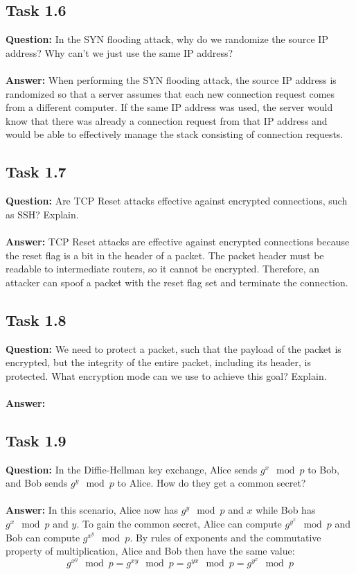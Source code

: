 \documentclass[11pt]{article}
\begin{document}
\subsection*{Task 1.6}

\textbf{Question: } In the SYN flooding attack, why do we randomize the source IP address? Why can’t we just use the same IP address? \\\\
\textbf{Answer: } When performing the SYN flooding attack, the source IP address is randomized so that a server assumes that each new connection request comes from a different computer. If the same IP address was used, the server would know that there was already a connection request from that IP address and would be able to effectively manage the stack consisting of connection requests.

\subsection*{Task 1.7}

\textbf{Question: } Are TCP Reset attacks effective against encrypted connections, such as SSH? Explain. \\\\
\textbf{Answer: } TCP Reset attacks are effective against encrypted connections because the reset flag is a bit in the header of a packet. The packet header must be readable to intermediate routers, so it cannot be encrypted. Therefore, an attacker can spoof a packet with the reset flag set and terminate the connection.

\subsection*{Task 1.8}

\textbf{Question: } We need to protect a packet, such that the payload of the packet is encrypted, but the integrity of the entire packet, including its header, is protected. What encryption mode can we use to achieve this goal? Explain. \\\\
\textbf{Answer: }

\subsection*{Task 1.9}

\textbf{Question: } 
In the Diffie-Hellman key exchange, Alice sends $g^x \mod p$ to Bob, and Bob sends $g^y \mod p$ to Alice. How do they get a common secret? \\\\
\textbf{Answer: } In this scenario, Alice now has $g^y \mod p$ and $x$ while Bob has $g^x \mod p$ and $y$. To gain the common secret, Alice can compute $g^{y^x} \mod p$ and Bob can compute $g^{x^y} \mod p$. By rules of exponents and the commutative property of multiplication, Alice and Bob then have the same value:
$$ g^{x^y} \mod p = g^{xy} \mod p = g^{yx} \mod p = g^{y^x} \mod p $$
\end{document}
